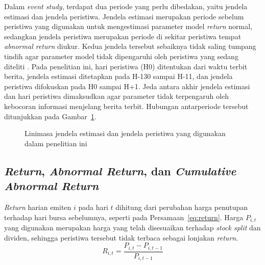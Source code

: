 Dalam \emph{event study}, terdapat dua periode yang perlu dibedakan, yaitu jendela estimasi dan jendela peristiwa. Jendela estimasi merupakan periode sebelum peristiwa yang digunakan untuk mengestimasi parameter model \emph{return} normal, sedangkan jendela peristiwa merupakan periode di sekitar peristiwa tempat \emph{abnormal return} diukur. Kedua jendela tersebut sebaiknya tidak saling tumpang tindih agar parameter model tidak dipengaruhi oleh peristiwa yang sedang diteliti \autocite{mackinlay1997}. Pada penelitian ini, hari peristiwa (H0) ditentukan dari waktu terbit berita, jendela estimasi ditetapkan pada H-130 sampai H-11, dan jendela peristiwa difokuskan pada H0 sampai H+1. Jeda antara akhir jendela estimasi dan hari peristiwa dimaksudkan agar parameter tidak terpengaruh oleh kebocoran informasi menjelang berita terbit. Hubungan antarperiode tersebut ditunjukkan pada Gambar~\ref{fig:linimasa-event-study}.

\begin{figure}[t]
  \centering
  \caption{Linimasa jendela estimasi dan jendela peristiwa yang digunakan dalam penelitian ini}
  \label{fig:linimasa-event-study}
\end{figure}

\subsection{\emph{Return}, \emph{Abnormal Return}, dan \emph{Cumulative Abnormal Return}}

\emph{Return} harian emiten $i$ pada hari $t$ dihitung dari perubahan harga penutupan terhadap hari bursa sebelumnya, seperti pada Persamaan~\ref{eq:return}. Harga $P_{i,t}$ yang digunakan merupakan harga yang telah disesuaikan terhadap \emph{stock split} dan dividen, sehingga peristiwa tersebut tidak terbaca sebagai lonjakan \emph{return}.
\begin{equation}
R_{i,t} = \frac{P_{i,t} - P_{i,t-1}}{P_{i,t-1}}
\label{eq:return}
\end{equation}

